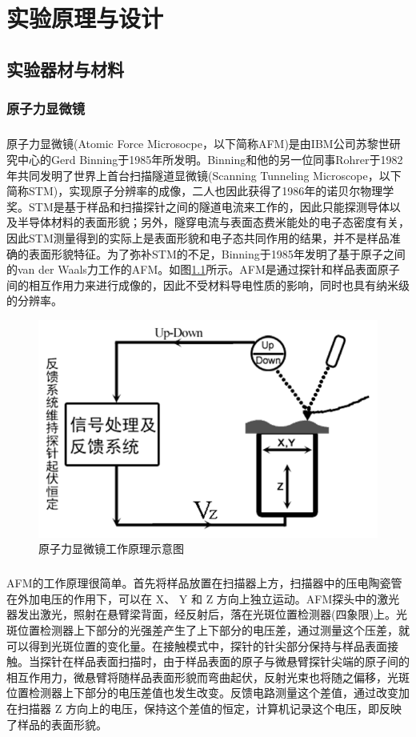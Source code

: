 \chapter{实验原理与设计}
\section{实验器材与材料}
\subsection{原子力显微镜}
\paragraph*{}
原子力显微镜(Atomic Force Microsocpe，以下简称AFM)是由IBM公司苏黎世研究中心的Gerd Binning于1985年所发明。Binning和他的另一位同事Rohrer于1982年共同发明了世界上首台扫描隧道显微镜(Scanning Tunneling Microscope，以下简称STM)，实现原子分辨率的成像，二人也因此获得了1986年的诺贝尔物理学奖。STM是基于样品和扫描探针之间的隧道电流来工作的，因此只能探测导体以及半导体材料的表面形貌；另外，隧穿电流与表面态费米能处的电子态密度有关，因此STM测量得到的实际上是表面形貌和电子态共同作用的结果，并不是样品准确的表面形貌特征。为了弥补STM的不足，Binning于1985年发明了基于原子之间的van der Waals力工作的AFM。如图\ref{fig:7}所示。AFM是通过探针和样品表面原子间的相互作用力来进行成像的，因此不受材料导电性质的影响，同时也具有纳米级的分辨率。
\begin{figure}
	\centering
	\includegraphics[width=0.7\linewidth]{figures/AFM1}
	\caption{原子力显微镜工作原理示意图}
	\label{fig:7}
\end{figure}
\paragraph*{}
AFM的工作原理很简单。首先将样品放置在扫描器上方，扫描器中的压电陶瓷管在外加电压的作用下，可以在 X、 Y 和 Z 方向上独立运动。AFM探头中的激光器发出激光，照射在悬臂梁背面，经反射后，落在光斑位置检测器(四象限)上。光斑位置检测器上下部分的光强差产生了上下部分的电压差，通过测量这个压差，就可以得到光斑位置的变化量。在接触模式中，探针的针尖部分保持与样品表面接触。当探针在样品表面扫描时，由于样品表面的原子与微悬臂探针尖端的原子间的相互作用力，微悬臂将随样品表面形貌而弯曲起伏，反射光束也将随之偏移，光斑位置检测器上下部分的电压差值也发生改变。反馈电路测量这个差值，通过改变加在扫描器 Z 方向上的电压，保持这个差值的恒定，计算机记录这个电压，即反映了样品的表面形貌。
